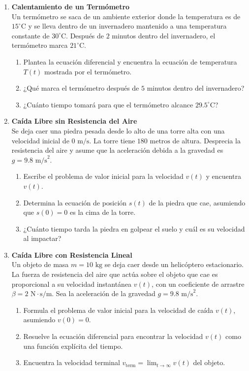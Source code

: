 \documentclass[a4paper,11pt]{article}
\begin{document}
\begin{enumerate}[itemsep=0.4cm, label=\textbf{\arabic*.}]
    \item \textbf{Calentamiento de un Termómetro} \\
    Un termómetro se saca de un ambiente exterior donde la temperatura es de $15^\circ\text{C}$ y se lleva dentro de un invernadero mantenido a una temperatura constante de $30^\circ\text{C}$. Después de $2$ minutos dentro del invernadero, el termómetro marca $21^\circ\text{C}$.
    \begin{enumerate}[label=(\alph*), itemsep=0.1cm]
        \item Plantea la ecuación diferencial y encuentra la ecuación de temperatura $T(t)$ mostrada por el termómetro.
        \item ¿Qué marca el termómetro después de $5$ minutos dentro del invernadero?
        \item ¿Cuánto tiempo tomará para que el termómetro alcance $29.5^\circ\text{C}$?
    \end{enumerate}

    \item \textbf{Caída Libre sin Resistencia del Aire} \\
    Se deja caer una piedra pesada desde lo alto de una torre alta con una velocidad inicial de $0\text{ m/s}$. La torre tiene $180\text{ metros}$ de altura. Desprecia la resistencia del aire y asume que la aceleración debida a la gravedad es $g = 9.8\text{ m/s}^2$.
    \begin{enumerate}[label=(\alph*), itemsep=0.1cm]
        \item Escribe el problema de valor inicial para la velocidad $v(t)$ y encuentra $v(t)$.
        \item Determina la ecuación de posición $s(t)$ de la piedra que cae, asumiendo que $s(0) = 0$ es la cima de la torre.
        \item ¿Cuánto tiempo tarda la piedra en golpear el suelo y cuál es su velocidad al impactar?
    \end{enumerate}

    \item \textbf{Caída Libre con Resistencia Lineal} \\
    Un objeto de masa $m = 10\text{ kg}$ se deja caer desde un helicóptero estacionario. La fuerza de resistencia del aire que actúa sobre el objeto que cae es proporcional a su velocidad instantánea $v(t)$, con un coeficiente de arrastre $\beta = 2\text{ N}\cdot\text{s/m}$. Sea la aceleración de la gravedad $g = 9.8\text{ m/s}^2$.
    \begin{enumerate}[label=(\alph*), itemsep=0.1cm]
        \item Formula el problema de valor inicial para la velocidad de caída $v(t)$, asumiendo $v(0) = 0$.
        \item Resuelve la ecuación diferencial para encontrar la velocidad $v(t)$ como una función explícita del tiempo.
        \item Encuentra la velocidad terminal $v_{\text{term}} = \lim_{t \to \infty} v(t)$ del objeto.
    \end{enumerate}


\end{enumerate}
\end{document}

